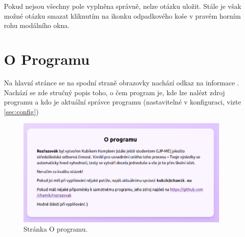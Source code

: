 Pokud nejsou všechny pole vyplněna správně, nelze otázku uložit. Stále je však možné otázku smazat kliknutím na ikonku odpadkového koše v pravém horním rohu modálního okna.

\section{O Programu}

Na hlavní stránce se na spodní straně obrazovky nachází odkaz na informace . Nachází se zde stručný popis toho, o čem program je, kde lze nalézt zdroj programu a kdo je aktuální správce programu (nastavitelné v konfiguraci, vizte \ref{sec:config})

\begin{figure}[H]
    \centering
    \includegraphics[width=400px]{images/01design/about.png}
    \caption{Stránka O programu.}
\end{figure}